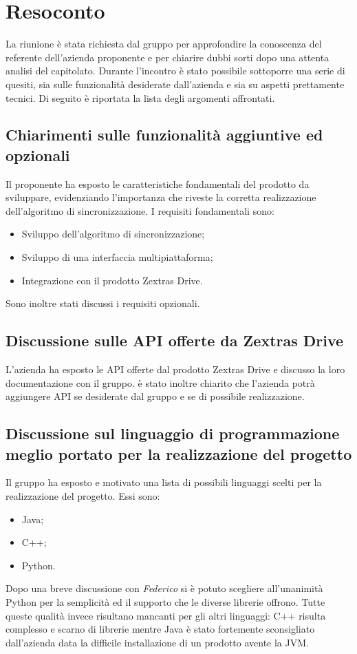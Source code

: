 \newpage


\section{Resoconto}
La riunione è stata richiesta dal gruppo \Gruppo{} per approfondire la conoscenza del referente dell'azienda proponente e per chiarire dubbi sorti dopo una attenta analisi del capitolato.
Durante l'incontro è stato possibile sottoporre una serie di quesiti, sia sulle funzionalità desiderate dall'azienda e sia su aspetti prettamente tecnici.
Di seguito è riportata la lista degli argomenti affrontati.
\subsection{Chiarimenti sulle funzionalità aggiuntive ed opzionali}
Il proponente ha esposto le caratteristiche fondamentali del prodotto da sviluppare, evidenziando l'importanza che riveste la corretta realizzazione dell'algoritmo di sincronizzazione.
I requisiti fondamentali sono:
\begin{itemize}
	\item Sviluppo dell'algoritmo di sincronizzazione;
	\item Sviluppo di una interfaccia multipiattaforma;
	\item Integrazione con il prodotto Zextras Drive.
\end{itemize}
Sono inoltre stati discussi i requisiti opzionali.
\subsection{Discussione sulle API offerte da Zextras Drive}
L'azienda ha esposto le API offerte dal prodotto Zextras Drive e discusso la loro documentazione con il gruppo. è stato inoltre chiarito che l'azienda potrà aggiungere API se  desiderate dal gruppo e se di possibile realizzazione.
\subsection{Discussione sul linguaggio di programmazione meglio portato per la realizzazione del progetto}
Il gruppo ha esposto e motivato una lista di possibili linguaggi scelti per la realizzazione del progetto. Essi sono:
\begin{itemize}
	\item Java;
	\item C++;
	\item Python.
\end{itemize}
Dopo una breve discussione con \textit{Federico} si è potuto scegliere all'unanimità Python per la semplicità ed il supporto che le diverse librerie offrono. Tutte queste qualità invece risultano mancanti per gli altri linguaggi: C++ risulta complesso e scarno di librerie mentre Java è stato fortemente sconsigliato dall'azienda data la difficile installazione di un prodotto avente la JVM.
\newpage

